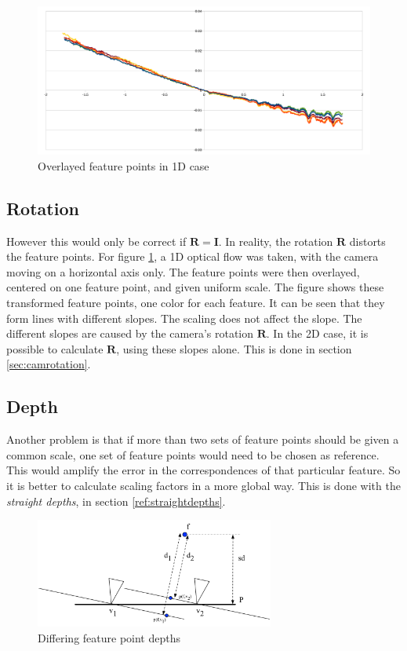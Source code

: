 \documentclass{scrreprt}
\newcommand{\matr}[1]{\mathbf{#1}}
\begin{document}
\begin{figure}
\centering
\includegraphics[width=\textwidth]{onedimslopes.pdf}
\caption{Overlayed feature points in 1D case}
\label{fig:onedimslopes}
\end{figure}

\subsection{Rotation}
However this would only be correct if $\matr{R} = \matr{I}$. In reality, the rotation $\matr{R}$ distorts the feature points. For figure \ref{fig:onedimslopes}, a 1D optical flow was taken, with the camera moving on a horizontal axis only. The feature points were then overlayed, centered on one feature point, and given uniform scale. The figure shows these transformed feature points, one color for each feature. It can be seen that they form lines with different slopes. The scaling does not affect the slope. The different slopes are caused by the camera's rotation $\matr{R}$. In the 2D case, it is possible to calculate $\matr{R}$, using these slopes alone. This is done in section \ref{sec:camrotation}.

\subsection{Depth}
Another problem is that if more than two sets of feature points should be given a common scale, one set of feature points would need to be chosen as reference. This would amplify the error in the correspondences of that particular feature. So it is better to calculate scaling factors in a more global way. This is done with the \emph{straight depths}, in section \ref{ref:straightdepths}.

\begin{figure}
\centering
\includegraphics[width=0.7\textwidth]{differentdepths.pdf}
\caption{Differing feature point depths}
\label{fig:differentdepths}
\end{figure}
\end{document}
